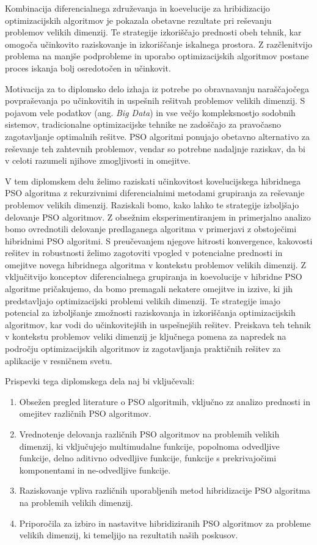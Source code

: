 Kombinacija diferencialnega združevanja in koevelucije za hribidizacijo optimizacijskih algoritmov je pokazala obetavne rezultate pri reševanju problemov velikih dimenzij.
Te strategije izkoriščajo prednosti obeh tehnik, kar omogoča učinkovito raziskovanje in izkoriščanje iskalnega prostora.
Z razčlenitvijo problema na manjše podprobleme in uporabo optimizacijskih algoritmov postane proces iskanja bolj osredotočen in učinkovit.

Motivacija za to diplomsko delo izhaja iz potrebe po obravnavanju naraščajočega povpraševanja po učinkovitih in uspešnih rešitvah problemov velikih dimenzij.
S pojavom vele podatkov (ang. \textit{Big Data}) in vse večjo kompleksnostjo sodobnih sistemov, tradicionalne optimizacijske tehnike ne zadoščajo za pravočasno zagotavljanje optimalnih rešitve.
PSO algoritmi ponujajo obetavno alternativo za reševanje teh zahtevnih problemov, vendar so potrebne nadaljnje raziskav, da bi v celoti razumeli njihove zmogljivosti in omejitve.

V tem diplomskem delu želimo raziskati učinkovitost kovelucijskega hibridnega PSO algoritma z rekurzivnimi diferencialnimi metodami grupiranja za reševanje problemov velikih dimenzij.
Raziskali bomo, kako lahko te strategije izboljšajo delovanje PSO algoritmov.
Z obsežnim eksperimentiranjem in primerjalno analizo bomo ovrednotili delovanje predlaganega algoritma v primerjavi z obstoječimi hibridnimi PSO algoritmi.
S preučevanjem njegove hitrosti konvergence, kakovosti rešitev in robustnosti želimo zagotoviti vpogled v potencialne prednosti in omejitve novega hibridnega algoritma v kontekstu problemov velikih dimenzij.
Z vključitvijo konceptov diferencialnega grupiranja in koevolucije v hibridne PSO algoritme pričakujemo, da bomo premagali nekatere omejitve in izzive, ki jih predstavljajo optimizacijski problemi velikih dimenzij.
Te strategije imajo potencial za izboljšanje zmožnosti raziskovanja in izkoriščanja optimizacijskih algoritmov,  kar vodi do učinkovitejših in uspešnejših rešitev.
Preiskava teh tehnik v kontekstu problemov veliki dimenzij je ključnega pomena za napredek na področju optimizacijskih algoritmov iz zagotavljanja praktičnih rešitev za aplikacije v resničnem svetu.

Prispevki tega diplomskega dela naj bi vključevali:
\begin{enumerate}
    \item Obsežen pregled literature o PSO algoritmih, vključno zz analizo prednosti in omejitev različnih PSO algoritmov.
    \item Vrednotenje delovanja različnih PSO algoritmov na problemih velikih dimenzij, ki vključujejo multimudalne funkcije, popolnoma odvedljive funkcije, delno aditivno odvedljive funkcije, funkcije s prekrivajočimi komponentami in ne-odvedljive funkcije.
    \item Raziskovanje vpliva različnih uporabljenih metod hibridizacije PSO algoritma na problemih velikih dimenzij.
    \item Priporočila za izbiro in nastavitve hibridiziranih PSO algoritmov za probleme velikih dimenzij, ki temeljijo na rezultatih naših poskusov.
\end{enumerate}

